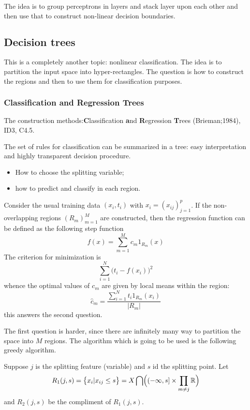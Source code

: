 \documentclass[a4paper]{article}
\newcommand{\Real}{\mathbb{R}}
\begin{document}
The idea is to group perceptrons in layers and stack layer upon each other and
then use that to construct non-linear decision boundaries.


\subsection{Decision trees} %
\label{sub:decision_trees}

This is a completely another topic: nonlinear classification. The idea is to partition
the input space into hyper-rectangles. The question is how to construct the regions
and then to use them for classification purposes.

\subsubsection{Classification and Regression Trees} %
\label{ssub:classification_and_regression_trees}

The construction methods:\textbf{C}lassification \textbf{a}nd \textbf{R}egression
\textbf{T}rees (Brieman;1984), ID3, C4.5.

The set of rules for classification can be summarized in a tree: easy interpretation
and highly transparent decision procedure.
\begin{itemize}
	\item How to choose the splitting variable;
	\item how to predict and classify in each region.
\end{itemize}

Consider the usual training data $(x_i,t_i)$ with $x_i = (x_{ij})_{j=1}^p$. If the
non-overlapping regions $(R_m)_{m=1}^M$ are constructed, then the regression function
can be defined as the following step function
\[f(x) = \sum_{m=1}^M c_m 1_{R_m}(x)\]
The criterion for minimization is 
\[\sum_{i=1}^N \bigl(t_i - f(x_i)\bigr)^2\]
whence the optimal values of $c_m$ are given by local means within the region:
\[\hat{c}_m = \frac{\sum_{i=1}^N t_i 1_{R_m}(x_i)}{|R_m|}\]
this answers the second question.


The first question is harder, since there are infinitely many way to partition the
space into $M$ regions. The algorithm which is going to be used is the following greedy
algorithm.

Suppose $j$ is the splitting feature (variable) and $s$ id the splitting point.
Let 
\[R_1(j,s)
= \bigl\{x_i\rvert x_{ij}\leq s\bigr\}
= X \bigcap \Bigl( (-\infty, s] \times \prod_{m\neq j} \Real \Bigr)
\]
and $R_2(j,s)$ be the compliment of $R_1(j,s)$.
\end{document}
